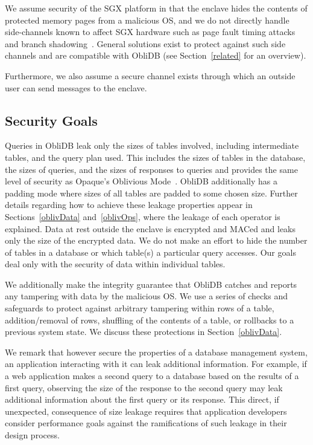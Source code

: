 \documentclass[letterpaper,twocolumn,10pt]{article}
\newcommand{\ignore}[1]{}
\def\name/{ObliDB}
\begin{document}
We assume security of the SGX platform in that the enclave hides the contents of protected memory pages from a malicious OS, and we do not directly handle side-channels known to affect SGX hardware such as page fault timing attacks~\cite{XCP15} and branch shadowing~\cite{LSG+16}. General solutions exist to protect against such side channels and are compatible with \name/ (see Section~\ref{related} for an overview). 

Furthermore, we also assume a secure channel exists through which an outside user can send messages to the enclave. \ignore{ (this is fairly straightforward with SGX), but we did not implement this for our tests, as it is not directly related to the functionality provided by \name/.} 
 
\subsection{Security Goals}
Queries in \name/ leak only the sizes of tables involved, including intermediate tables, and the query plan used. This includes the sizes of tables in the database, the sizes of queries, and the sizes of responses to queries and provides the same level of security as Opaque's Oblivious Mode~\cite{ZDB+17}. \name/ additionally has a padding mode where sizes of all tables are padded to some chosen size. Further details regarding how to achieve these leakage properties appear in Sections~\ref{oblivData} and~\ref{oblivOps}, where the leakage of each operator is explained. Data at rest outside the enclave is encrypted and MACed and leaks only the size of the encrypted data. We do not make an effort to hide the number of tables in a database or which table(s) a particular query accesses. Our goals deal only with the security of data within individual tables.

We additionally make the integrity guarantee that \name/ catches and reports any tampering with data by the malicious OS. We use a series of checks and safeguards to protect against arbitrary tampering within rows of a table, addition/removal of rows, shuffling of the contents of a table, or rollbacks to a previous system state. We discuss these protections in Section~\ref{oblivData}.

We remark that however secure the properties of a database management system, an application interacting with it can leak additional information. For example, if a web application makes a second query to a database based on the results of a first query, observing the size of the response to the second query may leak additional information about the first query or its response. This direct, if unexpected, consequence of size leakage requires that application developers consider performance goals against the ramifications of such leakage in their design process. 
\end{document}
